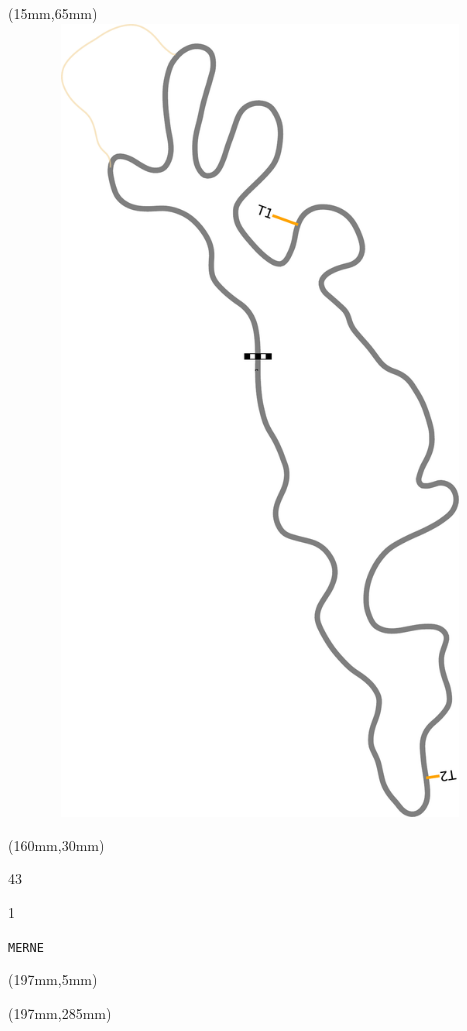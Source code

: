 \begin{textblock*}{185mm}(15mm,65mm)%
\centering
\mbox{\includegraphics[width=185mm,height=210mm,keepaspectratio]{PT/MERNE.pdf}}
\end{textblock*}
\begin{textblock*}{40mm}(160mm,30mm)%
\Large
\par{} 
\par43 
\par1 
\par\hfill\tiny\tt MERNE\\
\end{textblock*}
\begin{textblock*}{20mm}(197mm,5mm)%
\fbox{\thepage}
\label{MERNE}
\end{textblock*}
\begin{textblock*}{20mm}(197mm,285mm)%
\fbox{\thepage}
\end{textblock*}

